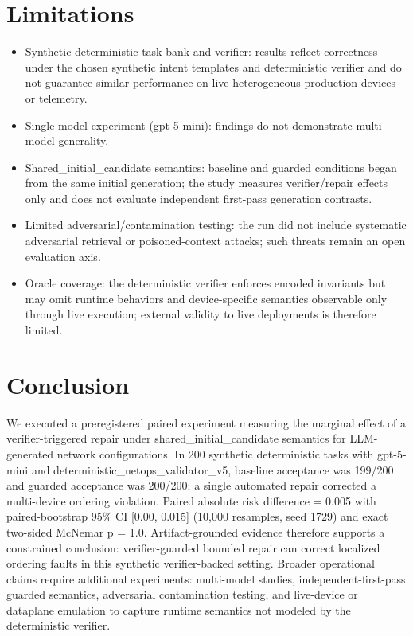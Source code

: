\documentclass[conference]{IEEEtran}
\begin{document}
\section{Limitations}
\begin{itemize}
\item Synthetic deterministic task bank and verifier: results reflect correctness under the chosen synthetic intent templates and deterministic verifier and do not guarantee similar performance on live heterogeneous production devices or telemetry.
\item Single-model experiment (gpt-5-mini): findings do not demonstrate multi-model generality.
\item Shared\_initial\_candidate semantics: baseline and guarded conditions began from the same initial generation; the study measures verifier/repair effects only and does not evaluate independent first-pass generation contrasts.
\item Limited adversarial/contamination testing: the run did not include systematic adversarial retrieval or poisoned-context attacks; such threats remain an open evaluation axis.
\item Oracle coverage: the deterministic verifier enforces encoded invariants but may omit runtime behaviors and device-specific semantics observable only through live execution; external validity to live deployments is therefore limited.
\end{itemize}

\section{Conclusion}
We executed a preregistered paired experiment measuring the marginal effect of a verifier-triggered repair under shared\_initial\_candidate semantics for LLM-generated network configurations. In 200 synthetic deterministic tasks with gpt-5-mini and deterministic\_netops\_validator\_v5, baseline acceptance was 199/200 and guarded acceptance was 200/200; a single automated repair corrected a multi-device ordering violation. Paired absolute risk difference = 0.005 with paired-bootstrap 95\% CI [0.00, 0.015] (10,000 resamples, seed 1729) and exact two-sided McNemar p = 1.0. Artifact-grounded evidence therefore supports a constrained conclusion: verifier-guarded bounded repair can correct localized ordering faults in this synthetic verifier-backed setting. Broader operational claims require additional experiments: multi-model studies, independent-first-pass guarded semantics, adversarial contamination testing, and live-device or dataplane emulation to capture runtime semantics not modeled by the deterministic verifier.
\end{document}
